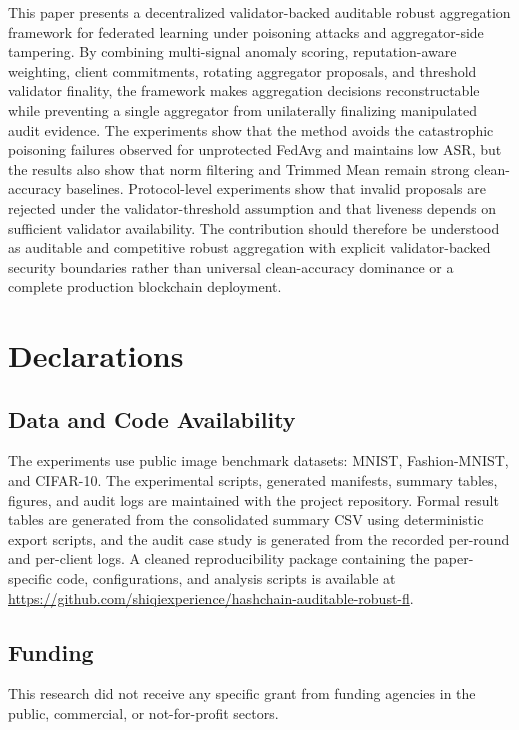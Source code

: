 \documentclass[preprint,authoryear,12pt]{elsarticle}
\begin{document}
This paper presents a decentralized validator-backed auditable robust aggregation framework for federated learning under poisoning attacks and aggregator-side tampering. By combining multi-signal anomaly scoring, reputation-aware weighting, client commitments, rotating aggregator proposals, and threshold validator finality, the framework makes aggregation decisions reconstructable while preventing a single aggregator from unilaterally finalizing manipulated audit evidence. The experiments show that the method avoids the catastrophic poisoning failures observed for unprotected FedAvg and maintains low ASR, but the results also show that norm filtering and Trimmed Mean remain strong clean-accuracy baselines. Protocol-level experiments show that invalid proposals are rejected under the validator-threshold assumption and that liveness depends on sufficient validator availability. The contribution should therefore be understood as auditable and competitive robust aggregation with explicit validator-backed security boundaries rather than universal clean-accuracy dominance or a complete production blockchain deployment.

\section{Declarations}

\subsection{Data and Code Availability}

The experiments use public image benchmark datasets: MNIST, Fashion-MNIST, and CIFAR-10. The experimental scripts, generated manifests, summary tables, figures, and audit logs are maintained with the project repository. Formal result tables are generated from the consolidated summary CSV using deterministic export scripts, and the audit case study is generated from the recorded per-round and per-client logs. A cleaned reproducibility package containing the paper-specific code, configurations, and analysis scripts is available at \url{https://github.com/shiqiexperience/hashchain-auditable-robust-fl}.

\subsection{Funding}

This research did not receive any specific grant from funding agencies in the public, commercial, or not-for-profit sectors.
\end{document}
